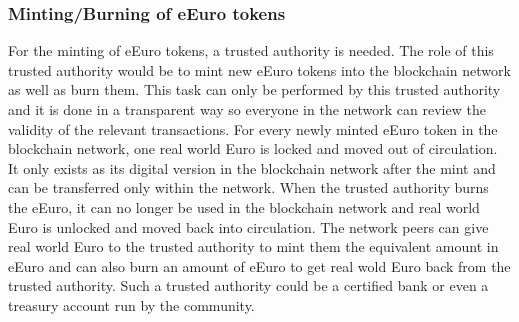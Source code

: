 \subsubsection{Minting/Burning of eEuro tokens}
For the minting of eEuro tokens, a trusted authority is needed. The role of this trusted authority would be to mint new eEuro tokens into the blockchain network as well as burn them. This
task can only be performed by this trusted authority and it is done in a transparent way so everyone in the network can review the validity of the relevant transactions.
For every newly minted eEuro token in the blockchain network, one real world Euro is locked and moved out of circulation. It only exists as its digital version in the blockchain network after the mint
and can be transferred only within the network. When the trusted authority burns the eEuro, it can no longer be used in the blockchain network and real world Euro is unlocked and moved back into circulation.
The network peers can give real world Euro to the trusted authority to mint them the equivalent amount in eEuro and can also burn an amount of eEuro to get real wold Euro back from the trusted authority.
Such a trusted authority could be a certified bank or even a treasury account run by the community.\\

